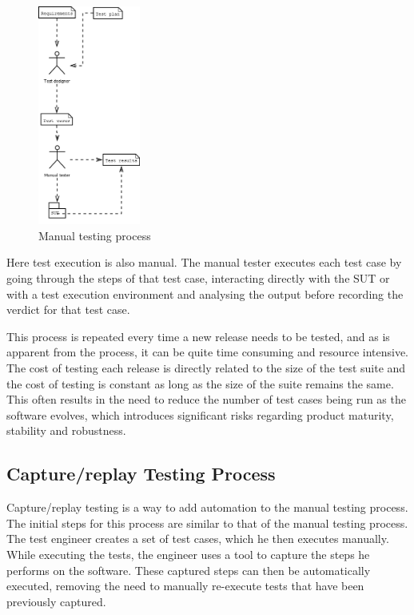 \begin{figure}[ht]
	\begin{center}
		\includegraphics*[width=0.3\textwidth]{kuvat/Manual_process}
	\end{center}
	\caption{Manual testing process}
	\label{fig:manualprocess}
\end{figure}

Here test execution is also manual. The manual tester executes each test case by going through the steps of that test case, interacting directly with the SUT or with a test execution environment and analysing the output before recording the verdict for that test case.

This process is repeated every time a new release needs to be tested, and as is apparent from the process, it can be quite time consuming and resource intensive. The cost of testing each release is directly related to the size of the test suite and the cost of testing is constant as long as the size of the suite remains the same. This often results in the need to reduce the number of test cases being run as the software evolves, which introduces significant risks regarding product maturity, stability and robustness.

\subsection{Capture/replay Testing Process}
Capture/replay testing is a way to add automation to the manual testing process. The initial steps for this process are similar to that of the manual testing process. The test engineer creates a set of test cases, which he then executes manually. While executing the tests, the engineer uses a tool to capture the steps he performs on the software. These captured steps can then be automatically executed, removing the need to manually re-execute tests that have been previously captured.

